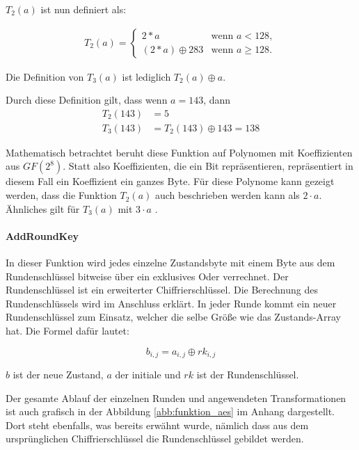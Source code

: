     $T_2(a)$ ist nun definiert als:
    
    \begin{equation*}
     \begin{aligned}
     T_2(a) = \begin{cases}
      2 * a 		 & \text{wenn $a < 128$},\\
      (2*a) \oplus 283 & \text{wenn $a \geq 128$}.
     \end{cases}
     \end{aligned}
    \end{equation*}
    
    Die Definition von $T_3(a)$ ist lediglich $T_2(a) \oplus a$.
    
    Durch diese Definition gilt, dass wenn $a = 143$, dann
    \begin{equation*}
     \begin{aligned}
     T_2(143) &= 5 \\
     T_3(143) &= T_2(143) \oplus 143 = 138
     \end{aligned}
    \end{equation*}
    
    Mathematisch betrachtet beruht diese Funktion auf Polynomen mit Koeffizienten aus $GF(2^8)$. Statt also
    Koeffizienten, die ein Bit repräsentieren, repräsentiert in diesem Fall ein Koeffizient ein ganzes Byte. Für diese
    Polynome kann gezeigt werden, dass die Funktion $T_2(a)$ auch beschrieben werden kann als $2 \cdot a$.
    Ähnliches gilt für $T_3(a)$ mit $3 \cdot a$ \cite{schmeh07}.
   
  \paragraph{AddRoundKey}
   In dieser Funktion wird jedes einzelne Zustandsbyte mit einem Byte aus dem Rundenschlüssel bitweise über
   ein exklusives Oder verrechnet. Der Rundenschlüssel ist ein erweiterter Chiffrierschlüssel. Die Berechnung
   des Rundenschlüssels wird im Anschluss erklärt. In jeder Runde kommt ein neuer Rundenschlüssel zum
   Einsatz, welcher die selbe Größe wie das Zustands-Array hat. Die Formel dafür lautet:
   
   \begin{equation*}
    b_{i,j} = a_{i,j} \oplus rk_{i,j}
   \end{equation*}
   
   $b$ ist der neue Zustand, $a$ der initiale und $rk$ ist der Rundenschlüssel.
   
   Der gesamte Ablauf der einzelnen Runden und angewendeten Transformationen ist auch grafisch in der
   Abbildung \ref{abb:funktion_aes} im Anhang dargestellt. Dort steht ebenfalls, was bereits erwähnt wurde,
   nämlich dass aus dem ursprünglichen Chiffrierschlüssel die Rundenschlüssel gebildet werden.
   
